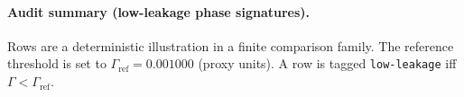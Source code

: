 \paragraph{Audit summary (low-leakage phase signatures).} \AuditTag Rows are a deterministic illustration in a finite comparison family. The reference threshold is set to $\Gamma_{\mathrm{ref}}=0.001000$ (proxy units). A row is tagged \texttt{low-leakage} iff $\Gamma<\Gamma_{\mathrm{ref}}$.